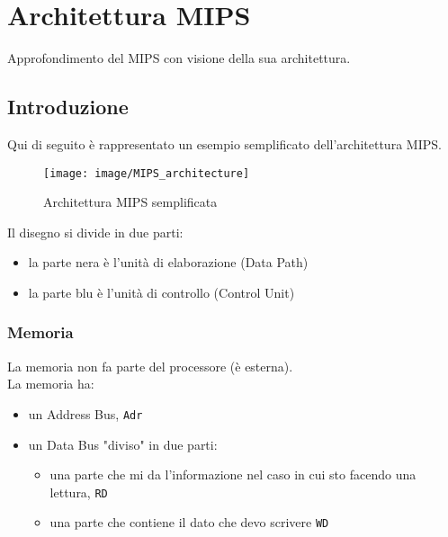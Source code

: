 \documentclass[../main.tex]{subfiles}
\begin{document}
    \chapter{Architettura MIPS}
    Approfondimento del MIPS con visione della sua architettura.
    \section{Introduzione}
    Qui di seguito è rappresentato un esempio semplificato
    dell'architettura MIPS.

    \begin{figure}[h!]
        \centering

        \vspace*{1cm}
        \texttt{[image: image/MIPS\_architecture]}
        \newline
        \caption{Architettura MIPS semplificata}
        \vspace*{1cm}
    \end{figure}

    \noindent
    Il disegno si divide in due parti:
    \begin{itemize}
        \item la parte nera è l'unità di elaborazione (Data Path)
        \item la parte blu è l'unità di controllo (Control Unit)
    \end{itemize}

    \newpage

    \subsection{Memoria}
    La memoria non fa parte del processore (è esterna). \\[3mm]
    La memoria ha:
    \begin{itemize}
        \item un Address Bus, \texttt{Adr}
        \item un Data Bus "diviso" in due parti:
        \begin{itemize}
            \item una parte che mi da l'informazione
            nel caso in cui sto facendo una lettura, \texttt{RD}
            \item una parte che contiene il dato che devo scrivere \texttt{WD}
        \end{itemize}
    \end{itemize}
    
\end{document}
